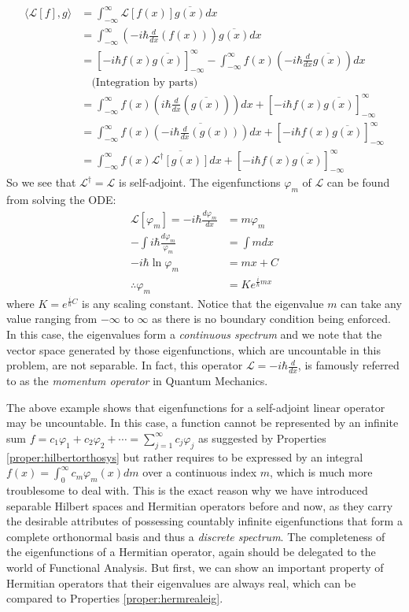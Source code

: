 \begin{solution}
\begin{align*}
\langle \mathcal{L}[f], g \rangle &= \int_{-\infty}^\infty \mathcal{L}[f(x)] \overline{g(x)} dx \\
&= \int_{-\infty}^\infty \left(-i \hbar\frac{d}{dx}(f(x))\right) \overline{g(x)} dx \\
&= [-i\hbar f(x)\overline{g(x)}]_{-\infty}^\infty - \int_{-\infty}^\infty f(x) \left(-i\hbar\frac{d}{dx}\overline{g(x)}\right) dx \\
&\quad \text{(Integration by parts)} \\
&= \int_{-\infty}^\infty f(x) \left(i\hbar\frac{d}{dx}(\overline{g(x)})\right) dx + [-i\hbar f(x)\overline{g(x)}]_{-\infty}^\infty \\
&= \int_{-\infty}^\infty f(x) \overline{\left(-i\hbar\frac{d}{dx}(g(x))\right)} dx + [-i\hbar f(x)\overline{g(x)}]_{-\infty}^\infty \\
&= \int_{-\infty}^\infty f(x) \overline{\mathcal{L}^\dag[g(x)]} dx + [-i\hbar f(x)\overline{g(x)}]_{-\infty}^\infty
\end{align*}
So we see that $\mathcal{L}^\dag = \mathcal{L}$ is self-adjoint. The eigenfunctions $\varphi_m$ of $\mathcal{L}$ can be found from solving the ODE:
\begin{align*}
\mathcal{L}[\varphi_m] = -i \hbar\frac{d\varphi_m}{dx} &= m\varphi_m \\
-\int i \hbar \frac{d\varphi_m}{\varphi_m} &= \int m dx \\
- i \hbar \ln{\varphi_m} &= mx + C \\
\therefore \varphi_m &= Ke^{\frac{i}{\hbar}mx}
\end{align*}
where $K = e^{\frac{i}{\hbar} C}$ is any scaling constant. Notice that the eigenvalue $m$ can take any value ranging from $-\infty$ to $\infty$ as there is no boundary condition being enforced. In this case, the eigenvalues form a \textit{continuous spectrum} and we note that the vector space generated by those eigenfunctions, which are uncountable in this problem, are not separable. In fact, this operator $\mathcal{L} = -i \hbar\frac{d}{dx}$, is famously referred to as the \textit{momentum operator} in Quantum Mechanics.
\end{solution}
The above example shows that eigenfunctions for a self-adjoint linear operator may be uncountable. In this case, a function cannot be represented by an infinite sum $f = c_1\varphi_1 + c_2\varphi_2 + \cdots = \sum_{j=1}^{\infty} c_j \varphi_j$ as suggested by Properties \ref{proper:hilbertorthosys} but rather requires to be expressed by an integral $f(x) = \int_0^\infty c_m\varphi_m(x) dm$ over a continuous index $m$, which is much more troublesome to deal with. This is the exact reason why we have introduced separable Hilbert spaces and Hermitian operators before and now, as they carry the desirable attributes of possessing countably infinite eigenfunctions that form a complete orthonormal basis and thus a \textit{discrete spectrum}. The completeness of the eigenfunctions of a Hermitian operator, again should be delegated to the world of Functional Analysis. But first, we can show an important property of Hermitian operators that their eigenvalues are always real, which can be compared to Properties \ref{proper:hermrealeig}.

